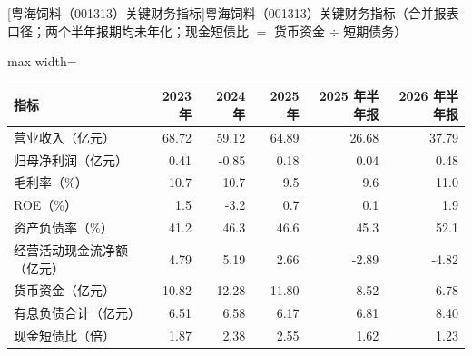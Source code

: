 \begin{center}\small\setlength{\tabcolsep}{3.4pt}
[粤海饲料（001313）关键财务指标]{粤海饲料（001313）关键财务指标（合并报表口径；两个半年报期均未年化；现金短债比 $=$ 货币资金 $\div$ 短期债务）}
\begin{adjustbox}{max width=\textwidth}
\begin{tabular}{@{}lrrrrr@{}}
\toprule
指标 & 2023 年 & 2024 年 & 2025 年 & 2025 年半年报 & 2026 年半年报 \\
\midrule
营业收入（亿元） & 68.72 & 59.12 & 64.89 & 26.68 & 37.79 \\
归母净利润（亿元） & 0.41 & -0.85 & 0.18 & 0.04 & 0.48 \\
毛利率（\%） & 10.7 & 10.7 & 9.5 & 9.6 & 11.0 \\
ROE（\%） & 1.5 & -3.2 & 0.7 & 0.1 & 1.9 \\
资产负债率（\%） & 41.2 & 46.3 & 46.6 & 45.3 & 52.1 \\
经营活动现金流净额（亿元） & 4.79 & 5.19 & 2.66 & -2.89 & -4.82 \\
货币资金（亿元） & 10.82 & 12.28 & 11.80 & 8.52 & 6.78 \\
有息负债合计（亿元） & 6.51 & 6.58 & 6.17 & 6.81 & 8.40 \\
现金短债比（倍） & 1.87 & 2.38 & 2.55 & 1.62 & 1.23 \\
\bottomrule
\end{tabular}
\end{adjustbox}
\end{center}

